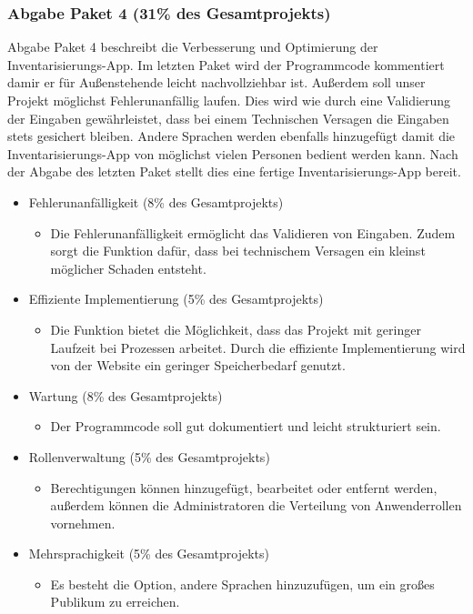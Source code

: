 \documentclass[11pt,a4paper]{report}
\begin{document}
\subsubsection{Abgabe Paket 4 (31\% des Gesamtprojekts)}
Abgabe Paket 4 beschreibt die Verbesserung und Optimierung der Inventarisierungs-App.
Im letzten Paket wird der Programmcode kommentiert damir er für Außenstehende leicht nachvollziehbar ist. Außerdem soll unser Projekt möglichst Fehlerunanfällig laufen.
Dies wird wie durch eine Validierung der Eingaben gewährleistet, dass bei einem  Technischen Versagen die Eingaben stets gesichert bleiben. 
Andere Sprachen werden ebenfalls hinzugefügt damit die Inventarisierungs-App von möglichst vielen Personen bedient werden kann.
Nach der Abgabe des letzten Paket stellt dies eine fertige Inventarisierungs-App bereit.
\begin{itemize}
\item
  Fehlerunanfälligkeit (8\% des Gesamtprojekts)

  \begin{itemize}
  \item
    Die Fehlerunanfälligkeit ermöglicht das Validieren von Eingaben. Zudem sorgt die Funktion 			dafür, dass bei technischem Versagen ein kleinst möglicher Schaden entsteht.
  \end{itemize}
  
\item
  Effiziente Implementierung (5\% des Gesamtprojekts)

  \begin{itemize}
  \item
    Die Funktion bietet die Möglichkeit, dass das Projekt mit geringer Laufzeit bei
    Prozessen arbeitet. Durch die effiziente Implementierung wird von der Website ein geringer 			Speicherbedarf genutzt. 
  \end{itemize}
  
\item
  Wartung (8\% des Gesamtprojekts)

  \begin{itemize}
  \item
    Der Programmcode soll gut dokumentiert und leicht strukturiert sein.
  \end{itemize}
  
\item
  Rollenverwaltung (5\% des Gesamtprojekts)

  \begin{itemize}
  \item
    Berechtigungen können hinzugefügt, bearbeitet oder entfernt werden,
    außerdem können die Administratoren die Verteilung von Anwenderrollen vornehmen.
  \end{itemize}
  
\item
  Mehrsprachigkeit (5\% des Gesamtprojekts)

  \begin{itemize}
  \item
    Es besteht die Option, andere Sprachen hinzuzufügen, um ein großes Publikum zu
    erreichen.
  \end{itemize}
  
\end{itemize}
\end{document}
